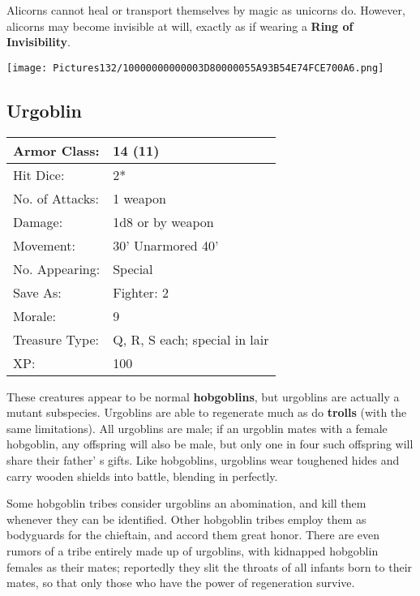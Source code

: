 \documentclass[a4paper,twoside,openany,10pt]{book}
\begin{document}
\begin{multicols}{2}
Alicorns cannot heal or transport themselves by magic as unicorns do. However, alicorns may become invisible at will, exactly as if wearing a \textbf{Ring of Invisibility}.

\begin{center} \texttt{[image: Pictures132/10000000000003D80000055A93B54E74FCE700A6.png]} \end{center}


\subsection*{Urgoblin}\label{urgoblin}

\begin{tabularx}{0.50\textwidth}{@{}lX@{}}
Armor Class: & 14 (11) \\\hline
Hit Dice: & 2* \\\hline
No. of Attacks: & 1 weapon \\\hline
Damage: & 1d8 or by weapon \\\hline
Movement: & 30' Unarmored 40' \\\hline
No. Appearing: & Special \\\hline
Save As: & Fighter: 2 \\\hline
Morale: & 9 \\\hline
Treasure Type: & Q, R, S each; special in lair \\\hline
XP: & 100 \\\hline
\end{tabularx}\medskip

These creatures appear to be normal \textbf{hobgoblins}, but urgoblins are actually a mutant subspecies. Urgoblins are able to regenerate much as do \textbf{trolls} (with the same limitations). All urgoblins are male; if an urgoblin mates with a female hobgoblin, any offspring will also be male, but only one in four such offspring will share their father' s gifts. Like hobgoblins, urgoblins wear toughened hides and carry wooden shields into battle, blending in perfectly.

Some hobgoblin tribes consider urgoblins an abomination, and kill them whenever they can be identified. Other hobgoblin tribes employ them as bodyguards for the chieftain, and accord them great honor. There are even rumors of a tribe entirely made up of urgoblins, with kidnapped hobgoblin females as their mates; reportedly they slit the throats of all infants born to their mates, so that only those who have the power of regeneration survive.


\end{multicols}
\end{document}
